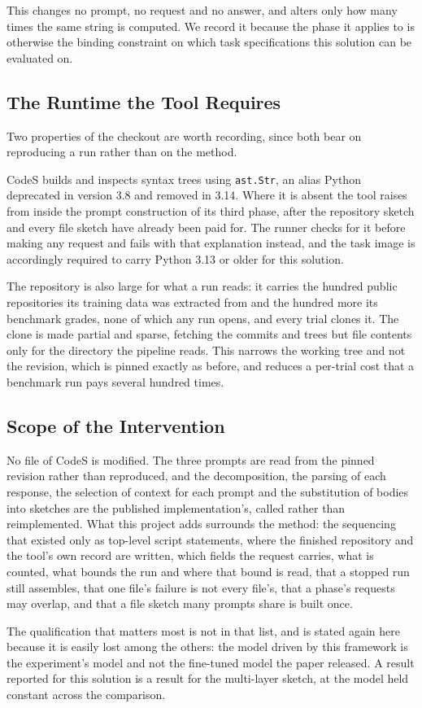 This changes no prompt, no request and no answer, and alters only how many
times the same string is computed. We record it because the phase it applies to
is otherwise the binding constraint on which task specifications this solution
can be evaluated on.

\subsection{The Runtime the Tool Requires}

Two properties of the checkout are worth recording, since both bear on
reproducing a run rather than on the method.

CodeS builds and inspects syntax trees using \texttt{ast.Str}, an alias Python
deprecated in version 3.8 and removed in 3.14. Where it is absent the tool
raises from inside the prompt construction of its third phase, after the
repository sketch and every file sketch have already been paid for. The runner
checks for it before making any request and fails with that explanation
instead, and the task image is accordingly required to carry Python 3.13 or
older for this solution.

The repository is also large for what a run reads: it carries the hundred
public repositories its training data was extracted from and the hundred more
its benchmark grades, none of which any run opens, and every trial clones it.
The clone is made partial and sparse, fetching the commits and trees but file
contents only for the directory the pipeline reads. This narrows the working
tree and not the revision, which is pinned exactly as before, and reduces a
per-trial cost that a benchmark run pays several hundred times.

\subsection{Scope of the Intervention}

No file of CodeS is modified. The three prompts are read from the pinned
revision rather than reproduced, and the decomposition, the parsing of each
response, the selection of context for each prompt and the substitution of
bodies into sketches are the published implementation's, called rather than
reimplemented. What this project adds surrounds the method: the sequencing that
existed only as top-level script statements, where the finished repository and
the tool's own record are written, which fields the request carries, what is
counted, what bounds the run and where that bound is read, that a stopped run
still assembles, that one file's failure is not every file's, that a phase's
requests may overlap, and that a file sketch many prompts share is built once.

The qualification that matters most is not in that list, and is stated again
here because it is easily lost among the others: the model driven by this
framework is the experiment's model and not the fine-tuned model the paper
released. A result reported for this solution is a result for the multi-layer
sketch, at the model held constant across the comparison.

